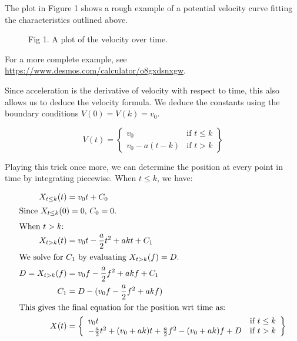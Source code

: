 \documentclass[a4paper,12pt]{article}
\begin{document}
The plot in Figure 1 shows a rough example of a potential
velocity curve fitting the characteristics outlined above.

\begin{figure}[htbp]
\centering
{}
\caption{Fig 1. A plot of the velocity over time.}
\label{fig:1}
\end{figure}

For a more complete example, see
\url{https://www.desmos.com/calculator/o8gxdsnxgw}.

Since acceleration is the derivative of velocity with respect to time, this
also allows us to deduce the velocity formula. We deduce the constants
using the boundary conditions $V(0) = V(k) = v_0$.

$$
  V(t) = \left\{
    \begin{array}{ll}
      v_0          & \mbox{if $t \leq k$} \\
      v_0 - a(t-k) & \mbox{if $t > k$}
    \end{array}
  \right\}
$$

Playing this trick once more, we can determine the position at every point in
time by integrating piecewise.  When $t \leq k$, we have:

\begin{align*}
  X_{t \leq k}(t) &= v_0 t + C_0 \\
  \intertext{Since $X_{t \leq k}(0) = 0$, $C_0=0$.}
  \intertext{When $t > k$:}
  X_{t > k}(t) &= v_0 t - \frac{a}{2} t^2 + akt + C_1 \\
  \intertext{We solve for $C_1$ by evaluating $X_{t > k}(f) = D$.}
  D = X_{t > k}(f) &= v_0 f - \frac{a}{2} f^2 + akf + C_1 \\
  C_1          &= D - (v_0 f - \frac{a}{2} f^2 + akf) \\
  \intertext{This gives the final equation for the position wrt time as:}
  X(t) &= \left\{
    \begin{array}{ll}
      v_0 t & \mbox{if $t \leq k$} \\
      - \frac{a}{2} t^2 + (v_0 + ak)t + \frac{a}{2} f^2 - (v_0 + ak) f + D & \mbox{if $t > k$}
    \end{array}
  \right\}
\end{align*}
\end{document}
